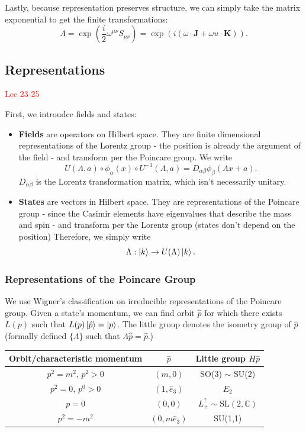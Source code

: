 \documentclass{article}
\begin{document}
Lastly, because representation preserves structure, we can simply take the matrix exponential to get the finite transformations:
$$\Lambda=\exp\left(\frac i2\omega^{\mu\nu}S_{\mu\nu}\right)=\exp\left(i(\omega\cdot\mathbf J+\omega u\cdot\mathbf K)\right).$$

\subsection{Representations}
\textcolor{red}{Lec 23-25}

First, we introudce fields and states:
\begin{itemize}
    \item \textbf{Fields} are operators on Hilbert space. They are finite dimensional representations of the Lorentz group - the position is already the argument of the field - and transform per the Poincare group. We write
    $$U(\Lambda,a)\circ\phi_\alpha(x)\circ U^{-1}(\Lambda,a)=D_{\alpha\beta}\phi_\beta(\Lambda x+a).$$
    $D_{\alpha\beta}$ is the Lorentz transformation matrix, which isn't necessarily unitary.
    \item \textbf{States} are vectors in Hilbert space. They are representations of the Poincare group - since the Casimir elements have eigenvalues that describe the mass and spin - and transform per the Lorentz group (states don't depend on the position) Therefore, we simply write 
    $$\Lambda:\ket k\to U(\Lambda)\ket k.$$
\end{itemize}

\subsubsection{Representations of the Poincare Group}

We use Wigner's classification on irreducible representations of the Poincare group. Given a state's momentum, we can find orbit $\hat p$ for which there exists $L(p)$ such that $L(p)\ket{\hat p}=\ket p$. The little group denotes the isometry group of $\hat p$ (formally defined $\{\Lambda\}$ such that $\Lambda\hat p=\hat p$.)

\begin{center}
\begin{tabular}{ |c|c|c| } 
\hline
 Orbit/characteristic momentum & $\hat{p}$ & Little group $H\hat{p}$ \\ 
 \hline
 $p^2=m^2,\,p^2>0$ & $(m,0)$ & SO(3) $\sim$ SU(2) \\ 
 \hline
 $p^2=0,\,p^0>0$ & $(1,\hat{e}_3)$ & $E_2$ \\ 
 \hline
 $p=0$ & $(0,0)$ & $L^\uparrow_+\sim\text{SL}(2,\mathbb C)$\\
 \hline
 $p^2=-m^2$ & $(0,m\hat e_3)$ & SU(1,1)\\
 \hline
\end{tabular}
\end{center}
\end{document}
